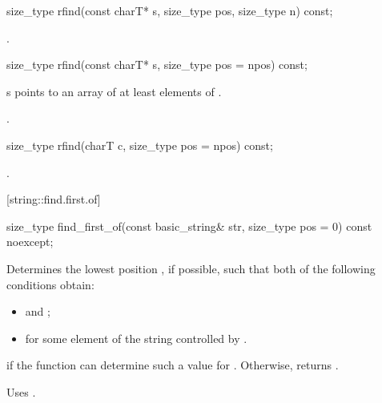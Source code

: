 %
%
\begin{itemdecl}
size_type rfind(const charT* s, size_type pos, size_type n) const;
\end{itemdecl}

\begin{itemdescr}
\pnum
\returns
{}.
\end{itemdescr}

%
%
\begin{itemdecl}
size_type rfind(const charT* s, size_type pos = npos) const;
\end{itemdecl}

\begin{itemdescr}
\pnum
\requires s points to an array of at least 
elements of .

\pnum
\returns
{}.
\end{itemdescr}

%
%
\begin{itemdecl}
size_type rfind(charT c, size_type pos = npos) const;
\end{itemdecl}

\begin{itemdescr}
\pnum
\returns
{}.
\end{itemdescr}

[string::find.first.of]{}

%
%
\begin{itemdecl}
size_type
  find_first_of(const basic_string& str,
                size_type pos = 0) const noexcept;
\end{itemdecl}

\begin{itemdescr}
\pnum
\effects
Determines the lowest position , if possible, such that both of
the following conditions obtain:

\begin{itemize}
\item
{}
and
;
\item
{}%
for some element  of the string controlled by .
\end{itemize}

\pnum
\returns
{} if the function can determine such a value for .
Otherwise, returns
.

\pnum
\notes
Uses
.
\end{itemdescr}


